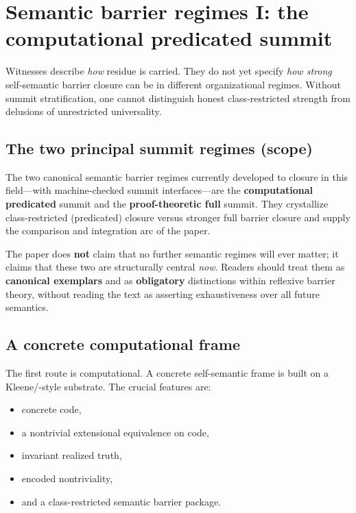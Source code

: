 \documentclass[11pt]{article}
\theoremstyle{plain}
\theoremstyle{definition}
\theoremstyle{remark}
\begin{document}
\section{Semantic barrier regimes I: the computational predicated summit}

Witnesses describe \emph{how} residue is carried. They do not yet specify \emph{how strong} self-semantic barrier closure can be in different organizational regimes. Without summit stratification, one cannot distinguish honest class-restricted strength from delusions of unrestricted universality.

\subsection{The two principal summit regimes (scope)}

The two canonical semantic barrier regimes currently developed to closure in this field---with machine-checked summit interfaces---are the \textbf{computational predicated} summit and the \textbf{proof-theoretic full} summit. They crystallize class-restricted (predicated) closure versus stronger full barrier closure and supply the comparison and integration arc of the paper.

The paper does \textbf{not} claim that no further semantic regimes will ever matter; it claims that these two are structurally central \emph{now}. Readers should treat them as \textbf{canonical exemplars} and as \textbf{obligatory} distinctions within reflexive barrier theory, without reading the text as asserting exhaustiveness over all future semantics.

\subsection{A concrete computational frame}

The first route is computational. A concrete self-semantic frame is built on a Kleene/\allowbreak{}-style substrate. The crucial features are:
\begin{itemize}
\item concrete code,
\item a nontrivial extensional equivalence on code,
\item invariant realized truth,
\item encoded nontriviality,
\item and a class-restricted semantic barrier package.
\end{itemize}
\end{document}
